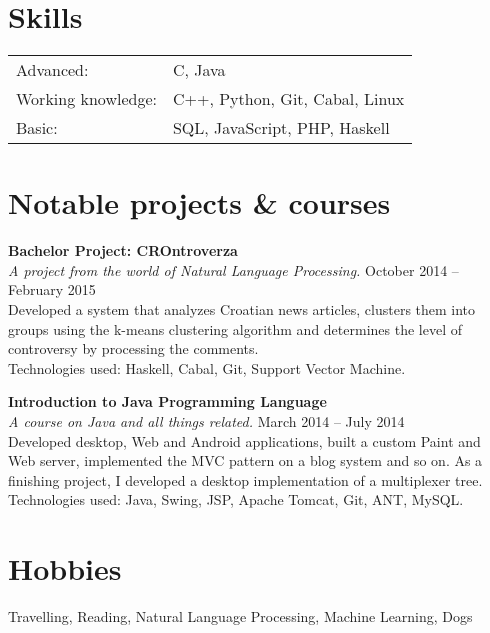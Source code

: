 \documentclass[margin,line]{resume}
\begin{document}
\begin{resume}
\vspace{-1mm}
\section{\mysidestyle Skills}

\begin{tabular}{@{}ll@{}}
Advanced: & C, Java \\%
Working knowledge: & C++, Python, Git, Cabal, Linux \\%
Basic: & SQL, JavaScript, PHP, Haskell \\%
\end{tabular}

\vspace{2mm}
\section{\mysidestyle Notable projects \& courses}

\textbf{Bachelor Project: CROntroverza} \vspace{2mm}\\\vspace{1mm}%
\textsl{A project from the world of Natural Language Processing.} \hfill October 2014 -- February 2015\\%
Developed a system that analyzes Croatian news articles, clusters them into groups using the k-means clustering algorithm and determines the level of controversy by processing the comments. \\
Technologies used: Haskell, Cabal, Git, Support Vector Machine.

\textbf{Introduction to Java Programming Language} \vspace{2mm}\\\vspace{1mm}%
\textsl{A course on Java and all things related.} \hfill March 2014 -- July 2014\\%
Developed desktop, Web and Android applications, built a custom Paint and Web server, implemented the MVC pattern on a blog system and so on. As a finishing project, I developed a desktop implementation of a multiplexer tree. \\
Technologies used: Java, Swing, JSP, Apache Tomcat, Git, ANT, MySQL.
\vspace{2mm}
\section{\mysidestyle Hobbies}

Travelling, Reading, Natural Language Processing, Machine Learning, Dogs

\end{resume}
\end{document}
